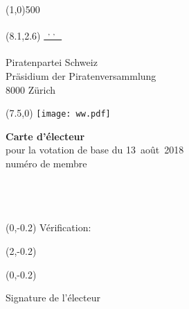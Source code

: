 \documentclass[11pt, a4paper]{scrartcl}
\begin{document}
{\begin{minipage}[t][13.42cm][t]{\textwidth}
\end{minipage}

\line(1,0){500}
\vspace{1cm}

\begin{minipage}[t][12.5cm][t]{\textwidth}

\begin{textblock}{9}(8.1,2.6)
\underline{\textsuperscript*{ \givenname~\surname, \street, \postalcode~\location }} \\
\vspace{-0.3cm} \\
Piratenpartei Schweiz \\
Präsidium der Piratenversammlung \\
8000 Zürich
\end{textblock}

\begin{textblock}{6}(7.5,0)
\texttt{[image: ww.pdf]}
\end{textblock}

{\LARGE\textbf{Carte d'électeur}} \\
pour la votation de base du 13~août~2018 \\

numéro de membre \textbf{\id}   \\
\givenname~\surname         \\
\street                     \\
\postalcode~\location       \\
%

\begin{textblock}{6}(0,-0.2)
Vérification:
\end{textblock}

\begin{textblock}{4}(2,-0.2)
\raggedright
\code
\end{textblock}

\vspace{4cm}

\begin{textblock}{6}(0,-0.2)
\begin{framed}
Signature de l'électeur \\
\vspace{1.5cm} ~ \\
\end{framed}
\end{textblock}


\end{minipage}}
\end{document}
